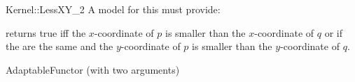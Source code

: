 \begin{ccRefFunctionObjectConcept}{Kernel::LessXY_2}
A model for this must provide:


{returns true iff the $x$-coordinate of $p$ is smaller than the
$x$-coordinate of $q$ or if the are the same and 
the $y$-coordinate of $p$ is smaller than the $y$-coordinate of $q$.}

\ccRefines
AdaptableFunctor (with two arguments)

\ccSeeAlso
{}\\

\end{ccRefFunctionObjectConcept}
